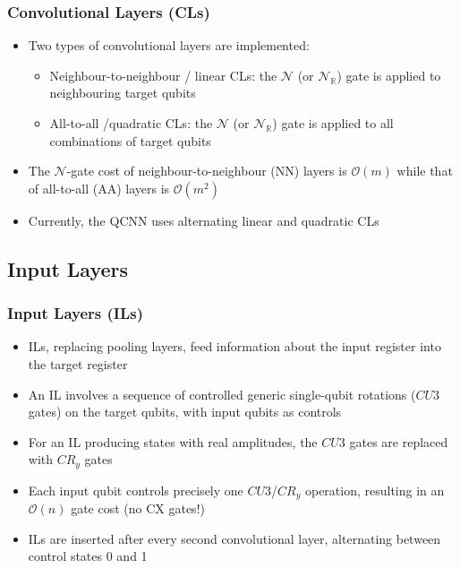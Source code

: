 \documentclass{beamer}
\begin{document}
\begin{frame}
\frametitle{Convolutional Layers (CLs)}
\begin{itemize}
\item Two types of convolutional layers are implemented:
\begin{itemize}
\item \alert{Neighbour-to-neighbour / linear CLs}: the $\mathcal{N}$ (or $\mathcal{N}_\mathbb{R}$) gate is applied to neighbouring target qubits 
\item \alert{All-to-all /quadratic CLs}: the $\mathcal{N}$ (or $\mathcal{N}_\mathbb{R}$) gate is applied to all combinations of target qubits
\end{itemize}
\item The $\mathcal{N}$-gate cost of neighbour-to-neighbour (NN) layers is \alert{$\mathcal{O}(m)$} while that of all-to-all (AA) layers is \alert{$\mathcal{O}(m^2)$}
\item Currently, the QCNN uses alternating linear and quadratic CLs
\end{itemize}
\end{frame} 

\begin{frame}
\subsection{Input Layers}
\frametitle{Input Layers (ILs)}
\begin{itemize}
\item ILs, replacing pooling layers, feed information about the input register into the target register 
\item An IL involves a sequence of controlled generic single-qubit rotations (\alert{$CU3$ gates}) on the target qubits, with input qubits as controls
\item For an IL producing states with \alert{real} amplitudes, the $CU3$ gates are replaced with \alert{$CR_y$ gates}
\item Each input qubit controls precisely one $CU3$/$CR_y$ operation, resulting in an \alert{$\mathcal{O}(n)$} gate cost (no CX gates!)
\item ILs are inserted after every second convolutional layer, alternating between control states 0 and 1  
\end{itemize}
\end{frame}
\end{document}
